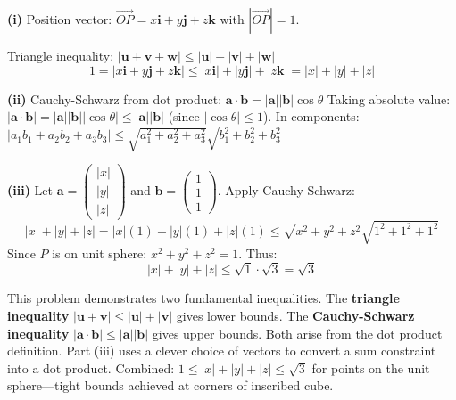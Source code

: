 \begin{solution}
\textbf{(i)} Position vector: $\vec{OP} = x\mathbf{i} + y\mathbf{j} + z\mathbf{k}$ with $|\vec{OP}| = 1$.

Triangle inequality: $|\mathbf{u} + \mathbf{v} + \mathbf{w}| \leq |\mathbf{u}| + |\mathbf{v}| + |\mathbf{w}|$
$$1 = |x\mathbf{i} + y\mathbf{j} + z\mathbf{k}| \leq |x\mathbf{i}| + |y\mathbf{j}| + |z\mathbf{k}| = |x| + |y| + |z|$$

\textbf{(ii)} Cauchy-Schwarz from dot product: $\mathbf{a} \cdot \mathbf{b} = |\mathbf{a}||\mathbf{b}|\cos\theta$
Taking absolute value: $|\mathbf{a} \cdot \mathbf{b}| = |\mathbf{a}||\mathbf{b}||\cos\theta| \leq |\mathbf{a}||\mathbf{b}|$ (since $|\cos\theta| \leq 1$).
In components: $|a_1b_1 + a_2b_2 + a_3b_3| \leq \sqrt{a_1^2 + a_2^2 + a_3^2}\sqrt{b_1^2 + b_2^2 + b_3^2}$

\textbf{(iii)} Let $\mathbf{a} = \begin{pmatrix} |x| \\ |y| \\ |z| \end{pmatrix}$ and $\mathbf{b} = \begin{pmatrix} 1 \\ 1 \\ 1 \end{pmatrix}$.
Apply Cauchy-Schwarz:
$$|x| + |y| + |z| = |x|(1) + |y|(1) + |z|(1) \leq \sqrt{x^2 + y^2 + z^2}\sqrt{1^2 + 1^2 + 1^2}$$
Since $P$ is on unit sphere: $x^2 + y^2 + z^2 = 1$. Thus:
$$|x| + |y| + |z| \leq \sqrt{1} \cdot \sqrt{3} = \sqrt{3}$$
\end{solution}

\begin{takeaways}
This problem demonstrates two fundamental inequalities. The \textbf{triangle inequality} $|\mathbf{u} + \mathbf{v}| \leq |\mathbf{u}| + |\mathbf{v}|$ gives lower bounds. The \textbf{Cauchy-Schwarz inequality} $|\mathbf{a} \cdot \mathbf{b}| \leq |\mathbf{a}||\mathbf{b}|$ gives upper bounds. Both arise from the dot product definition. Part (iii) uses a clever choice of vectors to convert a sum constraint into a dot product. Combined: $1 \leq |x| + |y| + |z| \leq \sqrt{3}$ for points on the unit sphere—tight bounds achieved at corners of inscribed cube.
\end{takeaways}

\vspace{1em}

